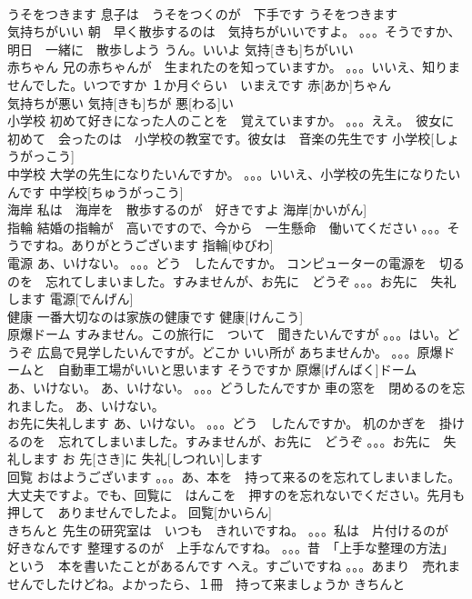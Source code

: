 \documentclass[8pt]{extreport}
\begin{document}
\begin{CJK}{UTF8}{min}
\\	うそをつきます	息子は　うそをつくのが　下手です	うそをつきます			
\\	気持ちがいい	朝　早く散歩するのは　気持ちがいいですよ。 。。。そうですか、明日　一緒に　散歩しよう うん。いいよ	気持[きも]ちがいい			
\\	赤ちゃん	兄の赤ちゃんが　生まれたのを知っていますか。 。。。いいえ、知りませんでした。いつですか １か月ぐらい　いまえです	赤[あか]ちゃん			
\\	気持ちが悪い		気持[きも]ちが 悪[わる]い			
\\	小学校	初めて好きになった人のことを　覚えていますか。 。。。ええ。　彼女に　初めて　会ったのは　小学校の教室です。彼女は　音楽の先生です	小学校[しょうがっこう]			
\\	中学校	大学の先生になりたいんですか。 。。。いいえ、小学校の先生になりたいんです	中学校[ちゅうがっこう]			
\\	海岸	私は　海岸を　散歩するのが　好きですよ	海岸[かいがん]			
\\	指輪	結婚の指輪が　高いですので、今から　一生懸命　働いてください 。。。そうですね。ありがとうございます	指輪[ゆびわ]					
\\	電源	あ、いけない。 。。。どう　したんですか。 コンピューターの電源を　切るのを　忘れてしまいました。すみませんが、お先に　どうぞ 。。。お先に　失礼します	電源[でんげん]			
\\	健康	一番大切なのは家族の健康です	健康[けんこう]			
\\	原爆ドーム	すみません。この旅行に　ついて　聞きたいんですが 。。。はい。どうぞ 広島で見学したいんですが。どこか いい所が あちませんか。 。。。原爆ドームと　自動車工場がいいと思います そうですか	原爆[げんばく]ドーム			
\\	あ、いけない。	あ、いけない。 。。。どうしたんですか 車の窓を　閉めるのを忘れました。	あ、いけない。			
\\	お先に失礼します	あ、いけない。 。。。どう　したんですか。 机のかぎを　掛けるのを　忘れてしまいました。すみませんが、お先に　どうぞ 。。。お先に　失礼します	お 先[さき]に 失礼[しつれい]します			
\\	回覧	おはようございます 。。。あ、本を　持って来るのを忘れてしまいました。 大丈夫ですよ。でも、回覧に　はんこを　押すのを忘れないでください。先月も　押して　ありませんでしたよ。	回覧[かいらん]			
\\	きちんと	先生の研究室は　いつも　きれいですね。 。。。私は　片付けるのが　好きなんです 整理するのが　上手なんですね。 。。。昔　「上手な整理の方法」という　本を書いたことがあるんです へえ。すごいですね 。。。あまり　売れませんでしたけどね。よかったら、１冊　持って来ましょうか	きちんと			

\end{CJK}
\end{document}
